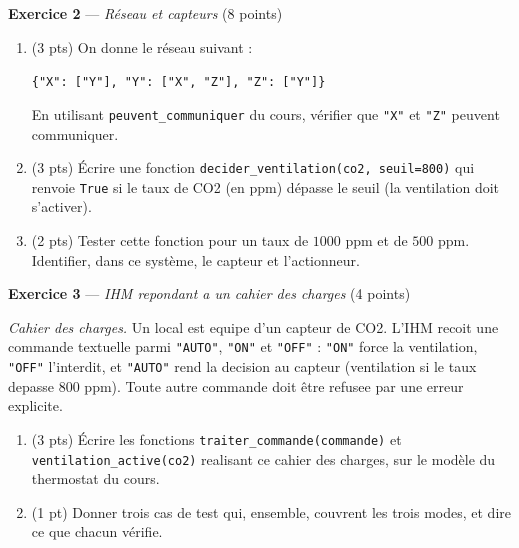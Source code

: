 \bigskip

\textbf{Exercice 2} --- \textit{Réseau et capteurs} \hfill (8 points)

\begin{enumerate}
  \item (3 pts) On donne le réseau suivant :
  \begin{center}\lstinline|{"X": ["Y"], "Y": ["X", "Z"], "Z": ["Y"]}|\end{center}
  En utilisant \lstinline{peuvent_communiquer} du cours, vérifier que \lstinline{"X"}
  et \lstinline{"Z"} peuvent communiquer.
  \item (3 pts) Écrire une fonction \lstinline{decider_ventilation(co2, seuil=800)} qui renvoie \lstinline{True} si le taux de CO2 (en ppm) dépasse le seuil (la ventilation doit s'activer).
  \item (2 pts) Tester cette fonction pour un taux de $1000$ ppm et de $500$ ppm. Identifier, dans ce système, le capteur et l'actionneur.
\end{enumerate}


\bigskip

\textbf{Exercice 3} --- \textit{IHM repondant a un cahier des charges} \hfill (4 points)

\textit{Cahier des charges.} Un local est equipe d'un capteur de CO2. L'IHM recoit une
commande textuelle parmi \lstinline{"AUTO"}, \lstinline{"ON"} et \lstinline{"OFF"} :
\lstinline{"ON"} force la ventilation, \lstinline{"OFF"} l'interdit, et \lstinline{"AUTO"}
rend la decision au capteur (ventilation si le taux depasse $800$ ppm). Toute autre commande
doit être refusee par une erreur explicite.

\begin{enumerate}
  \item (3 pts) Écrire les fonctions \lstinline{traiter_commande(commande)} et
  \lstinline{ventilation_active(co2)} realisant ce cahier des charges, sur le modèle du
  thermostat du cours.
  \item (1 pt) Donner trois cas de test qui, ensemble, couvrent les trois modes, et dire ce
  que chacun vérifie.
\end{enumerate}

